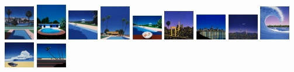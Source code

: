 \documentclass[
  letterpaper,
  DIV=11,
  numbers=noendperiod,
  oneside]{scrartcl}
\begin{document}
{\begin{footnotesize}
\includegraphics[width=0.52083in,height=\textheight,keepaspectratio]{img/jpf/31.jpg}
\includegraphics[width=0.52083in,height=\textheight,keepaspectratio]{img/jpf/32.jpg}
\includegraphics[width=0.52083in,height=\textheight,keepaspectratio]{img/jpf/34.jpg}
\includegraphics[width=0.52083in,height=\textheight,keepaspectratio]{img/jpf/35.jpg}
\includegraphics[width=0.52083in,height=\textheight,keepaspectratio]{img/jpf/36.jpg}
\includegraphics[width=0.52083in,height=\textheight,keepaspectratio]{img/jpf/37.jpg}
\includegraphics[width=0.52083in,height=\textheight,keepaspectratio]{img/jpf/38.jpg}
\includegraphics[width=0.52083in,height=\textheight,keepaspectratio]{img/jpf/39.jpg}
\includegraphics[width=0.52083in,height=\textheight,keepaspectratio]{img/jpf/40.jpg}
\includegraphics[width=0.52083in,height=\textheight,keepaspectratio]{img/jpf/41.jpg}
\includegraphics[width=0.52083in,height=\textheight,keepaspectratio]{img/jpf/42.jpg}

\end{footnotesize}}
\end{document}
